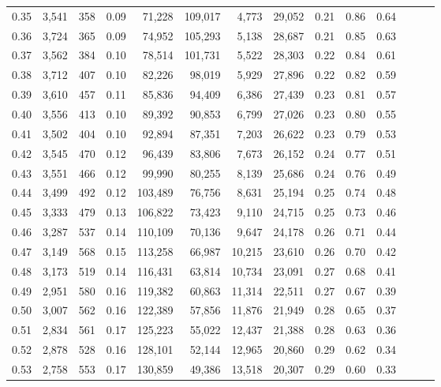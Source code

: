 \begin{tabular}{rrrrrrrrrrrrrr}
0.35 &  3,541 &  358 &  0.09 &   71,228 &  109,017 &   4,773 &  29,052 &  0.21 &  0.86 &      0.64 \\
0.36 &  3,724 &  365 &  0.09 &   74,952 &  105,293 &   5,138 &  28,687 &  0.21 &  0.85 &      0.63 \\
0.37 &  3,562 &  384 &  0.10 &   78,514 &  101,731 &   5,522 &  28,303 &  0.22 &  0.84 &      0.61 \\
0.38 &  3,712 &  407 &  0.10 &   82,226 &   98,019 &   5,929 &  27,896 &  0.22 &  0.82 &      0.59 \\
0.39 &  3,610 &  457 &  0.11 &   85,836 &   94,409 &   6,386 &  27,439 &  0.23 &  0.81 &      0.57 \\
0.40 &  3,556 &  413 &  0.10 &   89,392 &   90,853 &   6,799 &  27,026 &  0.23 &  0.80 &      0.55 \\
0.41 &  3,502 &  404 &  0.10 &   92,894 &   87,351 &   7,203 &  26,622 &  0.23 &  0.79 &      0.53 \\
0.42 &  3,545 &  470 &  0.12 &   96,439 &   83,806 &   7,673 &  26,152 &  0.24 &  0.77 &      0.51 \\
0.43 &  3,551 &  466 &  0.12 &   99,990 &   80,255 &   8,139 &  25,686 &  0.24 &  0.76 &      0.49 \\
0.44 &  3,499 &  492 &  0.12 &  103,489 &   76,756 &   8,631 &  25,194 &  0.25 &  0.74 &      0.48 \\
0.45 &  3,333 &  479 &  0.13 &  106,822 &   73,423 &   9,110 &  24,715 &  0.25 &  0.73 &      0.46 \\
0.46 &  3,287 &  537 &  0.14 &  110,109 &   70,136 &   9,647 &  24,178 &  0.26 &  0.71 &      0.44 \\
0.47 &  3,149 &  568 &  0.15 &  113,258 &   66,987 &  10,215 &  23,610 &  0.26 &  0.70 &      0.42 \\
0.48 &  3,173 &  519 &  0.14 &  116,431 &   63,814 &  10,734 &  23,091 &  0.27 &  0.68 &      0.41 \\
0.49 &  2,951 &  580 &  0.16 &  119,382 &   60,863 &  11,314 &  22,511 &  0.27 &  0.67 &      0.39 \\
0.50 &  3,007 &  562 &  0.16 &  122,389 &   57,856 &  11,876 &  21,949 &  0.28 &  0.65 &      0.37 \\
0.51 &  2,834 &  561 &  0.17 &  125,223 &   55,022 &  12,437 &  21,388 &  0.28 &  0.63 &      0.36 \\
0.52 &  2,878 &  528 &  0.16 &  128,101 &   52,144 &  12,965 &  20,860 &  0.29 &  0.62 &      0.34 \\
0.53 &  2,758 &  553 &  0.17 &  130,859 &   49,386 &  13,518 &  20,307 &  0.29 &  0.60 &      0.33 \\

\end{tabular}
